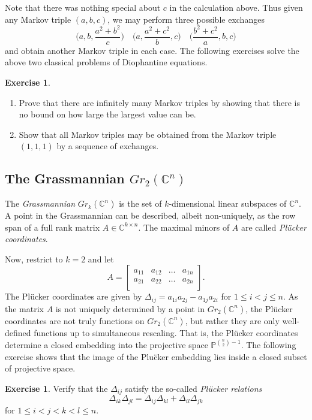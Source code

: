 \documentclass{amsart}
\theoremstyle{definition}
\newtheorem{example}[theorem]{Example}
\newtheorem{exercise}[theorem]{Exercise}
\theoremstyle{remark}
\numberwithin{equation}{section}
\newcommand{\CC}{{\mathbb{C}}}
\newcommand{\PP}{{\mathbb{P}}}
\begin{document}
    Note that there was nothing special about $c$ in the calculation above.  Thus given any Markov triple $(a,b,c)$, we may perform three possible exchanges 
    \[\Big(a,b,\frac{a^2+b^2}{c}\Big)\quad\Big(a,\frac{a^2+c^2}{b},c\Big)\quad\Big(\frac{b^2+c^2}{a},b,c\Big)\]
    and obtain another Markov triple in each case.  The following exercises solve the above two classical problems of Diophantine equations.
    \begin{exercise}\mbox{}
      \begin{enumerate}
        \item Prove that there are infinitely many Markov triples by showing that there is no bound on how large the largest value can be.
        \item Show that all Markov triples may be obtained from the Markov triple $(1,1,1)$ by a sequence of exchanges.
      \end{enumerate}
    \end{exercise}

	\subsection{The Grassmannian $Gr_{2}(\CC^n)$} \label{sub:Gr2n}
		The \emph{Grassmannian} $Gr_{k}(\CC^n)$ is the set of $k$-dimensional linear subspaces of $\CC^n$.  A point in the Grassmannian can be described, albeit non-uniquely, as the row span of a full rank matrix $A \in \CC^{k \times n}$.  The maximal minors of $A$ are called \emph{Pl\"ucker coordinates}.
		
		Now, restrict to $k=2$ and let 
		\begin{displaymath}
			A = \left[ \begin{array}{cccc}
			a_{11} & a_{12} & \ldots & a_{1n} \\
			a_{21} & a_{22} & \ldots & a_{2n} \\
			\end{array} \right].
		\end{displaymath}
		The Pl\"ucker coordinates are given by $\Delta_{ij} = a_{1i}a_{2j} - a_{1j}a_{2i}$ for $1 \leq i < j \leq n$.  As the matrix $A$ is not uniquely determined by a point in $Gr_2(\CC^n)$, the Pl\"ucker coordinates are not truly functions on $Gr_2(\CC^n)$, but rather they are only well-defined functions up to simultaneous rescaling.  That is, the Pl\"ucker coordinates determine a closed embedding into the projective space $\PP^{{n\choose 2}-1}$.  The following exercise shows that the image of the Plu\"cker embedding lies inside a closed subset of projective space.
		\begin{exercise}
			Verify that the $\Delta_{ij}$ satisfy the so-called \emph{Pl\"ucker relations}
			\begin{equation}\label{eq:short plucker special}
				\Delta_{ik}\Delta_{jl} = \Delta_{ij}\Delta_{kl} + \Delta_{il}\Delta_{jk}
			\end{equation}
			for $1 \leq i < j < k < l \leq n$.
		\end{exercise}
		
\end{document}
